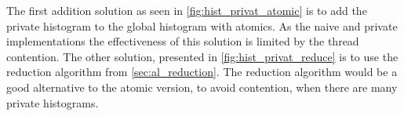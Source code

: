 The first addition solution as seen in \cref{fig:hist_privat_atomic} is to add the private histogram to the global histogram with atomics. As the naive and private  implementations the effectiveness of this solution is limited by the thread contention. The other solution, presented in \cref{fig:hist_privat_reduce} is to use the reduction algorithm from \cref{sec:al_reduction}. The reduction algorithm would be a good alternative to the atomic version, to avoid contention,  when there are many private histograms.       